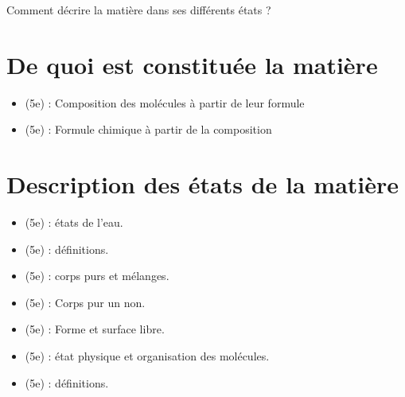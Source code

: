\documentclass[12pt,a4paper]{article}
\date{}
\title{}
\begin{document}
	
	



\begin{mypb}
	\begin{center}
		{\Large Comment décrire la matière dans ses différents états ?}
	\end{center}
\end{mypb}


\section{De quoi est constituée la matière}








\begin{myexos}
	\begin{itemize}
		\item {} (5e) : Composition des molécules à partir de leur formule
		\item {} (5e) : Formule chimique à partir de la composition
	\end{itemize}
\end{myexos}

\section{Description des états de la matière}





\begin{myexos}
	\begin{itemize}
		\item {} (5e) : états de l'eau.
		\item {} (5e) : définitions.
		\item {} (5e) : corps purs et mélanges.
		\item {} (5e) : Corps pur un non.
		\item {} (5e) : Forme et surface libre.
		\item {} (5e) : état physique et organisation des molécules.
		\item {} (5e) : définitions.
	\end{itemize}
\end{myexos}
\end{document}
